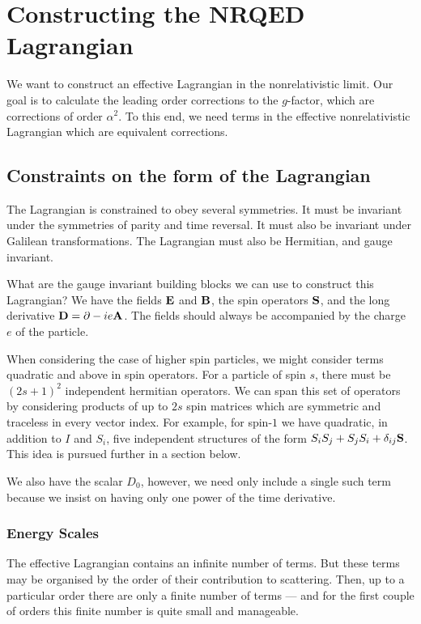\section{Constructing the NRQED Lagrangian}



We want to construct an effective Lagrangian in the nonrelativistic limit.  Our goal is to calculate the leading order corrections to the $g$-factor, which are corrections of order $\alpha^2$.  To this end, we need terms in the effective nonrelativistic Lagrangian which are equivalent corrections.


\subsection{Constraints on the form of the Lagrangian}
The Lagrangian is constrained to obey several symmetries.  It must be invariant under the symmetries of parity and time reversal.  It must also be invariant under Galilean transformations.  The Lagrangian must also be Hermitian, and gauge invariant.

What are the gauge invariant building blocks we can use to construct this Lagrangian?  We have the fields $\mathbf{E}$ and $\mathbf{B}$, the spin operators $\mathbf{S}$, and the long derivative $\mathbf{D} = \mathbf{\partial} - i e\mathbf{A}$.  The fields should always be accompanied by the charge $e$ of the particle.

When considering the case of higher spin particles, we might consider terms quadratic and above in spin operators.  For a particle of spin $s$, there must be $(2s+1)^2$ independent hermitian operators.  We can span this set of operators by considering products of up to $2s$ spin matrices which are symmetric and traceless in every vector index.  For example, for spin-$1$ we have quadratic, in addition to $I$ and $S_i$, five independent structures of the form $ S_i S_j + S_j S_i + \delta_{ij} \mathbf{S}$.  This idea is pursued further in a section below.


We also have the scalar $D_0$, however, we need only include a single such term because we insist on having only one power of the time derivative.



\subsubsection{Energy Scales}

The effective Lagrangian contains an infinite number of terms.  But these terms may be organised by the order of their contribution to scattering.  Then, up to a particular order there are only a finite number of terms --- and for the first couple of orders this finite number is quite small and manageable.

